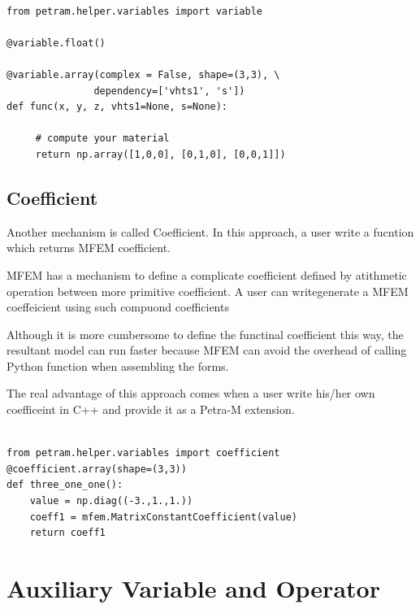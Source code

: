 \documentclass[11pt,a4paper,final]{report}
\begin{document}
\begin{minipage}[c]{0.95\textwidth}
\begin{lstlisting}[caption={A user defined generic preconditioner},captionpos=b, frame=single, label={function1}]

from petram.helper.variables import variable

@variable.float()

@variable.array(complex = False, shape=(3,3), \
               dependency=['vhts1', 's'])
def func(x, y, z, vhts1=None, s=None):

     # compute your material
     return np.array([1,0,0], [0,1,0], [0,0,1]])

\end{lstlisting}
 \end{minipage}
 
\subsection{Coefficient}
Another mechanism is called Coefficient. 
In this approach, a user write a fucntion which returns MFEM coefficient. 

MFEM has a mechanism to define a complicate coefficient defined by atithmetic operation between more primitive coefficient. 
A user can writegenerate a MFEM coeffeicient using such compuond coefficients

Although it is more cumbersome to define the functinal coefficient this way, the resultant model can run faster because MFEM can avoid the overhead of calling Python function when assembling the forms.

The real advantage of this approach comes when a user write his/her own coefficeint in C++ and provide it as a Petra-M extension.  


\begin{minipage}[c]{0.95\textwidth}
\begin{lstlisting}[caption={A user defined generic preconditioner},captionpos=b, frame=single, label={function1}]

from petram.helper.variables import coefficient
@coefficient.array(shape=(3,3))
def three_one_one():
    value = np.diag((-3.,1.,1.))   
    coeff1 = mfem.MatrixConstantCoefficient(value)
    return coeff1

\end{lstlisting}
 \end{minipage}
 
\section{Auxiliary Variable and Operator}
\end{document}
